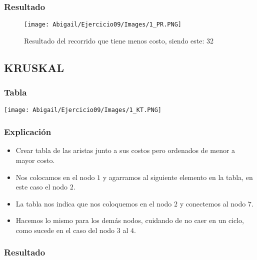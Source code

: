 \documentclass[12pt]{article}
\begin{document}
      \subsubsection{Resultado}
        \begin{figure}[h!]
          \centering
          \texttt{[image: Abigail/Ejercicio09/Images/1\_PR.PNG]}
           \caption{Resultado del recorrido que tiene menos costo, siendo este: 32}
        \end{figure} 

    \subsection{KRUSKAL}
        \begin{multicols}{2}
            \subsubsection{Tabla}
              \texttt{[image: Abigail/Ejercicio09/Images/1\_KT.PNG]}
              
        \columnbreak
        
            \subsubsection{Explicación}
                \begin{itemize}
        
                 \item[\checkmark] Crear tabla de las aristas junto a sus costos pero ordenados de menor a mayor costo.

                  \item[\checkmark] Nos colocamos en el nodo $1$ y agarramos al siguiente elemento en la tabla, en este caso el nodo $2$.
                  
                  \item[\checkmark] La tabla nos indica que nos coloquemos en el nodo $2$ y conectemos al nodo $7$.
                  
                  \item[\checkmark] Hacemos lo mismo para los demás nodos, cuidando de no caer en un ciclo, como sucede en el caso del nodo $3$ al $4$.
        
                \end{itemize}
        \end{multicols}
    \newpage
      \subsubsection{Resultado}
\end{document}
